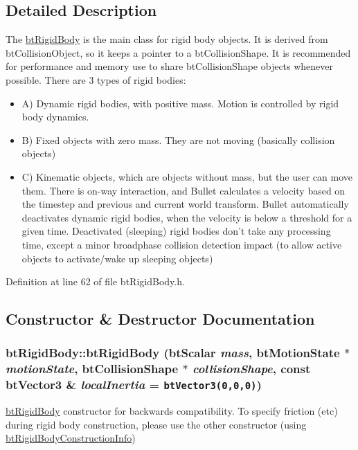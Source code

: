 \subsection{Detailed Description}
The \hyperlink{classbt_rigid_body}{btRigidBody} is the main class for rigid body objects. It is derived from btCollisionObject, so it keeps a pointer to a btCollisionShape. It is recommended for performance and memory use to share btCollisionShape objects whenever possible. There are 3 types of rigid bodies:\begin{itemize}
\item A) Dynamic rigid bodies, with positive mass. Motion is controlled by rigid body dynamics.\item B) Fixed objects with zero mass. They are not moving (basically collision objects)\item C) Kinematic objects, which are objects without mass, but the user can move them. There is on-way interaction, and Bullet calculates a velocity based on the timestep and previous and current world transform. Bullet automatically deactivates dynamic rigid bodies, when the velocity is below a threshold for a given time. Deactivated (sleeping) rigid bodies don't take any processing time, except a minor broadphase collision detection impact (to allow active objects to activate/wake up sleeping objects) \end{itemize}


Definition at line 62 of file btRigidBody.h.

\subsection{Constructor \& Destructor Documentation}
\hypertarget{classbt_rigid_body_ac9b7d050bc87644d38e9ffe4fe4c5ab}{
\subsubsection[btRigidBody]{\setlength{\rightskip}{0pt plus 5cm}btRigidBody::btRigidBody (btScalar {\em mass}, \/  {\bf btMotionState} $\ast$ {\em motionState}, \/  btCollisionShape $\ast$ {\em collisionShape}, \/  const btVector3 \& {\em localInertia} = {\tt btVector3(0,0,0)})}}
\label{classbt_rigid_body_ac9b7d050bc87644d38e9ffe4fe4c5ab}


\hyperlink{classbt_rigid_body}{btRigidBody} constructor for backwards compatibility. To specify friction (etc) during rigid body construction, please use the other constructor (using \hyperlink{structbt_rigid_body_1_1bt_rigid_body_construction_info}{btRigidBodyConstructionInfo}) 

